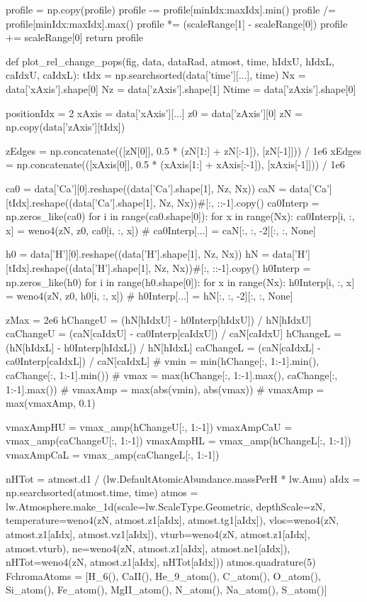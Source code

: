 \begin{pycode}[2DRT]
    profile = np.copy(profile)
    profile -= profile[minIdx:maxIdx].min()
    profile /= profile[minIdx:maxIdx].max()
    profile *= (scaleRange[1] - scaleRange[0])
    profile += scaleRange[0]
    return profile


def plot_rel_change_pops(fig, data, dataRad, atmost, time, hIdxU, hIdxL, caIdxU, caIdxL):
    tIdx = np.searchsorted(data['time'][...], time)
    Nx = data['xAxis'].shape[0]
    Nz = data['zAxis'].shape[1]
    Ntime = data['zAxis'].shape[0]

    positionIdx = 2
    xAxis = data['xAxis'][...]
    z0 = data['zAxis'][0]
    zN = np.copy(data['zAxis'][tIdx])

    zEdges = np.concatenate(([zN[0]], 0.5 * (zN[1:] + zN[:-1]), [zN[-1]])) / 1e6
    xEdges = np.concatenate(([xAxis[0]], 0.5 * (xAxis[1:] + xAxis[:-1]), [xAxis[-1]])) / 1e6

    ca0 = data['Ca'][0].reshape((data['Ca'].shape[1], Nz, Nx))
    caN = data['Ca'][tIdx].reshape((data['Ca'].shape[1], Nz, Nx))#[:, ::-1].copy()
    ca0Interp = np.zeros_like(ca0)
    for i in range(ca0.shape[0]):
        for x in range(Nx):
            ca0Interp[i, :, x] = weno4(zN, z0, ca0[i, :, x])
#     ca0Interp[...] = caN[:, :, -2][:, :, None]

    h0 = data['H'][0].reshape((data['H'].shape[1], Nz, Nx))
    hN = data['H'][tIdx].reshape((data['H'].shape[1], Nz, Nx))#[:, ::-1].copy()
    h0Interp = np.zeros_like(h0)
    for i in range(h0.shape[0]):
        for x in range(Nx):
            h0Interp[i, :, x] = weno4(zN, z0, h0[i, :, x])
#     h0Interp[...] = hN[:, :, -2][:, :, None]


    zMax = 2e6
    hChangeU = (hN[hIdxU] - h0Interp[hIdxU]) / hN[hIdxU]
    caChangeU = (caN[caIdxU] - ca0Interp[caIdxU]) / caN[caIdxU]
    hChangeL = (hN[hIdxL] - h0Interp[hIdxL]) / hN[hIdxL]
    caChangeL = (caN[caIdxL] - ca0Interp[caIdxL]) / caN[caIdxL]
#     vmin = min(hChange[:, 1:-1].min(), caChange[:, 1:-1].min())
#     vmax = max(hChange[:, 1:-1].max(), caChange[:, 1:-1].max())
#     vmaxAmp = max(abs(vmin), abs(vmax))
#     vmaxAmp = max(vmaxAmp, 0.1)

    vmaxAmpHU = vmax_amp(hChangeU[:, 1:-1])
    vmaxAmpCaU = vmax_amp(caChangeU[:, 1:-1])
    vmaxAmpHL = vmax_amp(hChangeL[:, 1:-1])
    vmaxAmpCaL = vmax_amp(caChangeL[:, 1:-1])

    nHTot = atmost.d1 / (lw.DefaultAtomicAbundance.massPerH * lw.Amu)
    aIdx = np.searchsorted(atmost.time, time)
    atmos = lw.Atmosphere.make_1d(scale=lw.ScaleType.Geometric, depthScale=zN,
                                  temperature=weno4(zN, atmost.z1[aIdx], atmost.tg1[aIdx]),
                                  vlos=weno4(zN, atmost.z1[aIdx], atmost.vz1[aIdx]),
                                  vturb=weno4(zN, atmost.z1[aIdx], atmost.vturb),
                                  ne=weno4(zN, atmost.z1[aIdx], atmost.ne1[aIdx]),
                                  nHTot=weno4(zN, atmost.z1[aIdx], nHTot[aIdx]))
    atmos.quadrature(5)
    FchromaAtoms = [H_6(), CaII(), He_9_atom(), C_atom(), O_atom(), Si_atom(), Fe_atom(),
                MgII_atom(), N_atom(), Na_atom(), S_atom()]


\end{pycode}
